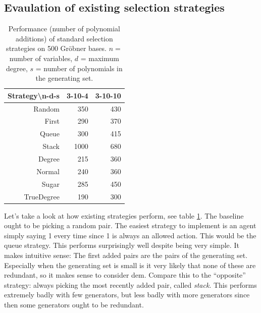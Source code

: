 \documentclass{article}
\theoremstyle{changedot}
\theoremstyle{changedotbreak}
\theoremstyle{nonumberplain}
\begin{document}
\subsection{Evaulation of existing selection strategies}
\begin{table}[h!]
  \begin{center}
    \begin{tabular}{r|rr}
      Strategy\textbackslash n-d-s & 3-10-4 & 3-10-10 \\ \hline
      Random         & 350    & 430     \\
      First          & 290    & 370     \\
      Queue          & 300    & 415     \\
      Stack          & 1000   & 680     \\
      Degree         & 215    & 360     \\
      Normal         & 240    & 360     \\
      Sugar          & 285    & 450     \\
      TrueDegree     & 190    & 300
    \end{tabular}
    \caption{Performance (number of polynomial additions) of standard selection strategies on 500 Gröbner bases. $n=$ number of variables, $d$ = maximum degree, $s$ = number of polynomials in the generating set.}
    \label{tab:std_perf}
  \end{center}
\end{table}


Let's take a look at how existing strategies perform, see table \ref{tab:std_perf}. The baseline ought to be picking a random pair. The easiest strategy to implement is an agent simply saying 1 every time since 1 is always an allowed action. This would be the queue strategy. This performs surprisingly well despite being very simple. It makes intuitive sense: The first added pairs are the pairs of the generating set. Especially when the generating set is small is it very likely that none of these are redundant, so it makes sense to consider dem. Compare this to the ``opposite'' strategy: always picking the most recently added pair, called \emph{stack}. This performs extremely badly with few generators, but less badly with more generators since then some generators ought to be redundant.
\end{document}
